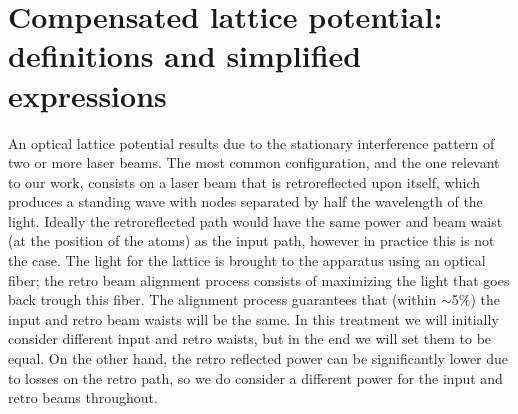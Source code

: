 \documentclass[11pt,letter]{article}
\newcommand{\bv}[1]{\ensuremath{\bm{#1}}}
\begin{document}
%

\section{Compensated lattice potential: definitions and simplified expressions}
\label{sec:complatt}

An optical lattice potential results due to the stationary interference pattern
of two or more laser beams.   The most common configuration, and the one
relevant to our work, consists on a laser beam that is retroreflected upon
itself, which produces a standing wave with nodes separated by half the
wavelength of the light.   Ideally the retroreflected path would have the same
power and beam waist (at the position of the atoms) as the input path, however
in practice this is not the case.   The light for the lattice is brought to the
apparatus using an optical fiber; the retro beam alignment process consists of
maximizing the light that goes back trough this fiber.   The alignment process
guarantees that (within $\sim$5\%) the input and retro beam waists will be the
same. In this treatment we will initially consider different input and retro
waists, but in the end we will set them to be equal.   On the other hand, the
retro reflected power can be significantly lower due to losses on the retro
path, so we do consider a different power for the input and retro beams
throughout. 
\end{document}
